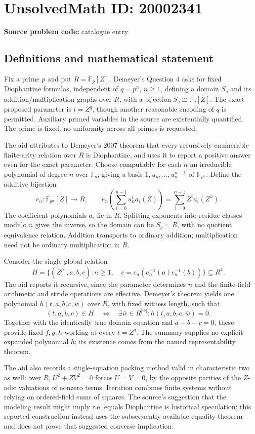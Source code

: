 \documentclass[11pt]{article}
\newcommand{\F}{\mathbb{F}}
\begin{document}
\section*{UnsolvedMath ID: 20002341}
\textbf{Source problem code:} catalogue entry
\subsection{Definitions and mathematical statement}
Fix a prime \(p\) and put \(R=\F_p[Z]\). Demeyer's Question 4 asks for fixed Diophantine formulas, independent of \(q=p^n\), \(n\ge1\), defining a domain \(S_q\) and its addition/multiplication graphs over \(R\), with a bijection \(S_q\cong\F_q[Z]\). The exact proposed parameter is \(t=Z^q\), though another reasonable encoding of \(q\) is permitted. Auxiliary primed variables in the source are existentially quantified. The prime is fixed; no uniformity across all primes is requested.

The aid attributes to Demeyer's 2007 theorem that every recursively enumerable finite-arity relation over \(R\) is Diophantine, and uses it to report a positive answer even for the exact parameter. Choose computably for each \(n\) an irreducible polynomial of degree \(n\) over \(\F_p\), giving a basis \(1,u_n,\ldots,u_n^{n-1}\) of \(\F_{p^n}\). Define the additive bijection
\[
 e_n:\F_{p^n}[Z]\longrightarrow R,\qquad
 e_n\left(\sum_{i=0}^{n-1}u_n^i a_i(Z)\right)
 =\sum_{i=0}^{n-1}Z^i a_i(Z^n).
\]
The coefficient polynomials \(a_i\) lie in \(R\). Splitting exponents into residue classes modulo \(n\) gives the inverse, so the domain can be \(S_q=R\), with no quotient equivalence relation. Addition transports to ordinary addition; multiplication need not be ordinary multiplication in \(R\).

Consider the single global relation
\[
 H=\{(Z^{p^n},a,b,c):n\ge1,\quad
 c=e_n(e_n^{-1}(a)e_n^{-1}(b))\}\subseteq R^4.
\]
The aid reports it recursive, since the parameter determines \(n\) and the finite-field arithmetic and stride operations are effective. Demeyer's theorem yields one polynomial \(h(t,a,b,c,\bar w)\) over \(R\), with fixed witness length, such that
\[
 (t,a,b,c)\in H\quad\Longleftrightarrow\quad
 \exists\bar w\in R^{|\bar w|}:h(t,a,b,c,\bar w)=0.
\]
Together with the identically true domain equation and \(a+b-c=0\), these provide fixed \(f,g,h\) working at every \(t=Z^q\). The summary supplies no explicit expanded polynomial \(h\); its existence comes from the named representability theorem.

The aid also records a single-equation packing method valid in characteristic two as well: over \(R\), \(U^2+ZV^2=0\) forces \(U=V=0\), by the opposite parities of the \(Z\)-adic valuations of nonzero terms. Iteration combines finite systems without relying on ordered-field sums of squares. The source's suggestion that the modeling result might imply r.e. equals Diophantine is historical speculation; this reported construction instead uses the subsequently available equality theorem and does not prove that suggested converse implication.
\end{document}
